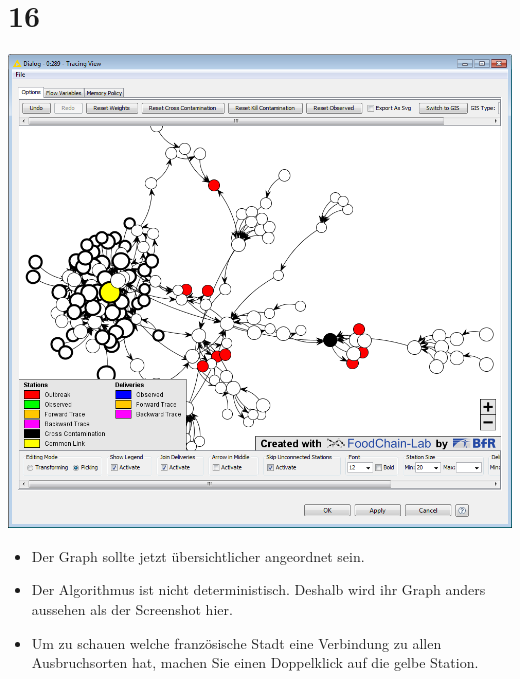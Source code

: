 \documentclass{beamer}
\begin{document}
\section{16}
\begin{frame}
	\begin{center}
  		\includegraphics[height=0.6\textheight]{16.png}
	\end{center}
	\begin{itemize}
		\item Der Graph sollte jetzt übersichtlicher angeordnet sein.
		\item Der Algorithmus ist nicht deterministisch. Deshalb wird ihr Graph anders aussehen als der Screenshot hier.
		\item Um zu schauen welche französische Stadt eine Verbindung zu allen Ausbruchsorten hat, machen Sie einen Doppelklick auf die gelbe Station.
	\end{itemize}
\end{frame}
\end{document}
